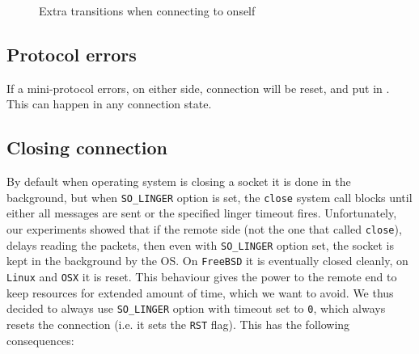 \begin{figure}[p]
{}
  \caption{Extra transitions when connecting to onself}
  \label{fig:statediagram-selfconn}
\end{figure}

\subsection{Protocol errors}
If a mini-protocol errors, on either side, connection will be reset, and put in
\TerminatedState{}. This can happen in any connection state.


\subsection{Closing connection}\label{sec:connection-close}

By default when operating system is closing a socket it is done in the
background, but when \texttt{SO\_LINGER} option is set, the \texttt{close}
system call blocks until either all messages are sent or the specified linger
timeout fires. Unfortunately, our experiments showed that if the remote side
(not the one that called \texttt{close}), delays reading the packets, then even
with \texttt{SO\_LINGER} option set, the socket is kept in the background by
the OS.  On \texttt{FreeBSD} it is eventually closed cleanly, on \texttt{Linux}
and \texttt{OSX} it is reset. This behaviour gives the power to the
remote end to keep resources for extended amount of time, which we want to
avoid. We thus decided to always use \texttt{SO\_LINGER} option with timeout
set to \texttt{0}, which always resets the connection (i.e. it sets the
\texttt{RST} \TCP{} flag). This has the following consequences:

